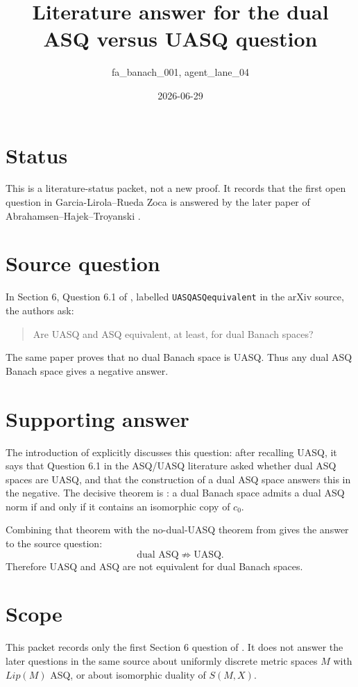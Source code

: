 \documentclass[11pt]{amsart}
\title{Literature answer for the dual ASQ versus UASQ question}
\author{fa\_banach\_001, agent\_lane\_04}
\date{2026-06-29}
\begin{document}
\maketitle

\section*{Status}

This is a literature-status packet, not a new proof.  It records that the
first open question in Garcia-Lirola--Rueda Zoca \cite{GLRZ2017} is answered
by the later paper of Abrahamsen--Hajek--Troyanski \cite{AHT2019}.

\section*{Source question}

In Section 6, Question 6.1 of \cite{GLRZ2017}, labelled
\texttt{UASQASQequivalent} in the arXiv source, the authors ask:
\begin{quote}
Are UASQ and ASQ equivalent, at least, for dual Banach spaces?
\end{quote}
The same paper proves that no dual Banach space is UASQ.  Thus any dual ASQ
Banach space gives a negative answer.

\section*{Supporting answer}

The introduction of \cite{AHT2019} explicitly discusses this question: after
recalling UASQ, it says that Question 6.1 in the ASQ/UASQ literature asked
whether dual ASQ spaces are UASQ, and that the construction of a dual ASQ
space answers this in the negative.  The decisive theorem is
\cite[Theorem 3.7]{AHT2019}: a dual Banach space admits a dual ASQ norm if and
only if it contains an isomorphic copy of $c_0$.

Combining that theorem with the no-dual-UASQ theorem from \cite{GLRZ2017}
gives the answer to the source question:
\[
        \text{dual ASQ} \not\Rightarrow \text{UASQ}.
\]
Therefore UASQ and ASQ are not equivalent for dual Banach spaces.

\section*{Scope}

This packet records only the first Section 6 question of \cite{GLRZ2017}.  It
does not answer the later questions in the same source about uniformly
discrete metric spaces $M$ with $Lip(M)$ ASQ, or about isomorphic duality of
$S(M,X)$.
\end{document}
